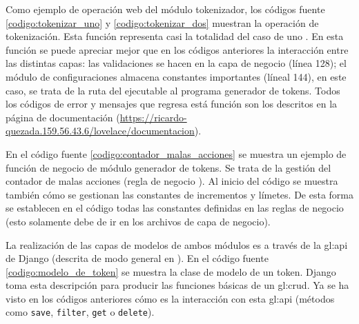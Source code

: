 Como ejemplo de operación web del módulo tokenizador, los códigos fuente \ref{codigo:tokenizar_uno} y \ref{codigo:tokenizar_dos} muestran la operación de tokenización. Esta función representa casi la totalidad del caso de uno . En esta función se puede apreciar mejor que en los códigos anteriores la interacción entre las distintas capas: las validaciones se hacen en la capa de negocio (línea 128); el módulo de configuraciones almacena constantes importantes (líneal 144), en este caso, se trata de la ruta del ejecutable al programa generador de tokens. Todos los códigos de error y mensajes que regresa está función son los descritos en la página de documentación (\url{https://ricardo-quezada.159.56.43.6/lovelace/documentacion}).



En el código fuente \ref{codigo:contador_malas_acciones} se muestra un ejemplo de función de negocio de módulo generador de tokens. Se trata de la gestión del contador de malas acciones (regla de negocio ). Al inicio del código se muestra también cómo se gestionan las constantes de incrementos y límetes. De esta forma se establecen en el código todas las constantes definidas en las reglas de negocio (esto solamente debe de ir en los archivos de capa de negocio).


La realización de las capas de modelos de ambos módulos es a través de la \gls{gl:api} de Django (descrita de modo general en \cite{}). En el código fuente \ref{codigo:modelo_de_token} se muestra la clase de modelo de un token. Django toma esta descripción para producir las funciones básicas de un \gls{gl:crud}. Ya se ha visto en los códigos anteriores cómo es la interacción con esta \gls{gl:api} (métodos como \texttt{save}, \texttt{filter}, \texttt{get} o \texttt{delete}).


